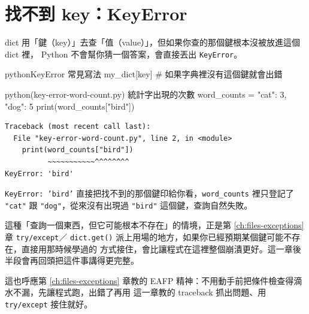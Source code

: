 
\section{找不到 key：KeyError}
\label{sec:key-error}

dict 用「鍵（key）」去查「值（value）」，但如果你查的那個鍵根本沒被放進這個 dict 裡，
Python 不會幫你猜一個答案，會直接丟出 \texttt{KeyError}。

\begin{code}{python}{KeyError 常見寫法}
my_dict[key]     # 如果字典裡沒有這個鍵就會出錯
\end{code}

\begin{example}{python}{(key-error-word-count.py) 統計字出現的次數}
word_counts = {"cat": 3, "dog": 5}
print(word_counts["bird"])
\end{example}

\begin{verbatim}
Traceback (most recent call last):
  File "key-error-word-count.py", line 2, in <module>
    print(word_counts["bird"])
          ~~~~~~~~~~~^^^^^^^^
KeyError: 'bird'
\end{verbatim}

\texttt{KeyError: 'bird'} 直接把找不到的那個鍵印給你看，\texttt{word\_counts} 裡只登記了
\texttt{"cat"} 跟 \texttt{"dog"}，從來沒有出現過 \texttt{"bird"} 這個鍵，查詢自然失敗。

這種「查詢一個東西，但它可能根本不存在」的情境，正是第 \ref{ch:files-exceptions} 章 \texttt{try/except}／
\texttt{dict.get()} 派上用場的地方，如果你已經預期某個鍵可能不存在，直接用那時候學過的
方式接住，會比讓程式在這裡整個崩潰更好。這一章後半段會再回頭把這件事講得更完整。

這也呼應第 \ref{ch:files-exceptions} 章教的 EAFP 精神：不用動手前把條件檢查得滴水不漏，先讓程式跑，出錯了再用
這一章教的 traceback 抓出問題、用 \texttt{try/except} 接住就好。

